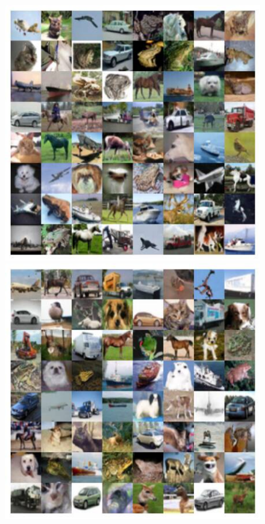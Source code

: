 \begin{figure}[ht!]
  \includegraphics[width=\linewidth]{figs/imgs/ddpm_cifar10_data_samples_T_1000.jpg}
  \label{subfig:cifar10_1000}
\endminipage\hfill
{}
  \includegraphics[width=\linewidth]{figs/imgs/ddpm_cifar10_data_samples_T_900.jpg}

\end{figure}
